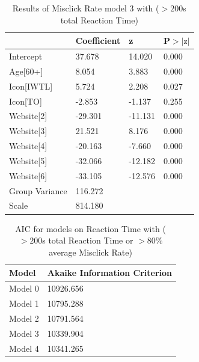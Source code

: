 \documentclass[12pt,twoside]{reedthesis}
\begin{document}
\begin{table}[h!]
        \centering
        \begin{tabular}{| p{5cm} | p{2.5cm} | p{2.5cm} | p{2.5cm} |}
            \hline
            & Coefficient & z & P$>|\text{z}|$\\
            \hline
            Intercept & 37.678 & 14.020 & 0.000\\
            \hline
            Age[60+] & 8.054 & 3.883 & 0.000\\
            \hline
            Icon[IWTL] & 5.724 & 2.208 & 0.027\\
            \hline
            Icon[TO] & -2.853 & -1.137 & 0.255\\
            \hline
            Website[2] & -29.301 & -11.131 & 0.000\\
            \hline
            Website[3] & 21.521 & 8.176 & 0.000\\
            \hline
            Website[4] & -20.163 & -7.660 & 0.000\\
            \hline
            Website[5] & -32.066 & -12.182 & 0.000\\
            \hline
            Website[6] & -33.105 & -12.576 & 0.000\\
            \hline
            Group Variance & 116.272 &&\\
            \hline
            Scale & 814.180 &&\\
            \hline
        \end{tabular}
        \caption{Results of Misclick Rate model 3 with ($>200$s total Reaction Time)}
    \end{table}

   \begin{table}[h!]
        \centering
        \begin{tabular}{| p{3.5cm} | p{7.5cm} |}
            \hline
            Model & Akaike Information Criterion\\
            \hline
            Model 0 & 10926.656\\
            \hline
            Model 1 & 10795.288\\
            \hline
            Model 2 & 10791.564\\
            \hline
            Model 3 & 10339.904\\
            \hline
            Model 4 & 10341.265\\
            \hline
        \end{tabular}
        \caption{AIC for models on Reaction Time with ($>200$s total Reaction Time or $>80$\% average Misclick Rate)}
    \end{table}
\end{document}
